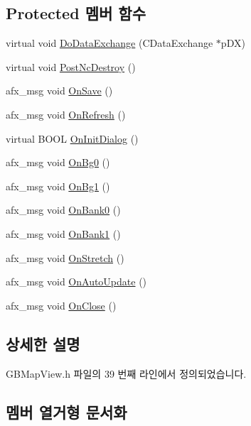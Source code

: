 \subsection*{Protected 멤버 함수}
\begin{DoxyCompactItemize}
\item 
virtual void \mbox{\hyperlink{class_g_b_map_view_a8d268ce36e59f20ebabe08aa9dbed9f0}{Do\+Data\+Exchange}} (C\+Data\+Exchange $\ast$p\+DX)
\item 
virtual void \mbox{\hyperlink{class_g_b_map_view_ac613a0601eb7bea0ca757dda85011b73}{Post\+Nc\+Destroy}} ()
\item 
afx\+\_\+msg void \mbox{\hyperlink{class_g_b_map_view_a667f0f830b816e2ec34519d75a5ad488}{On\+Save}} ()
\item 
afx\+\_\+msg void \mbox{\hyperlink{class_g_b_map_view_ac34b80cd3cb8b8b6d434e59dcfb3bed2}{On\+Refresh}} ()
\item 
virtual B\+O\+OL \mbox{\hyperlink{class_g_b_map_view_a3bcd4b5e76fbe0ae04809770fce64765}{On\+Init\+Dialog}} ()
\item 
afx\+\_\+msg void \mbox{\hyperlink{class_g_b_map_view_a7e9247c42189f718f173f765c4d5a5ba}{On\+Bg0}} ()
\item 
afx\+\_\+msg void \mbox{\hyperlink{class_g_b_map_view_a8cbe9a5f305ebaff40a3a345f444ef98}{On\+Bg1}} ()
\item 
afx\+\_\+msg void \mbox{\hyperlink{class_g_b_map_view_a157cce075c5c7ad137098c04201ce30d}{On\+Bank0}} ()
\item 
afx\+\_\+msg void \mbox{\hyperlink{class_g_b_map_view_a7a1e36efab710bedd617b431486a42b3}{On\+Bank1}} ()
\item 
afx\+\_\+msg void \mbox{\hyperlink{class_g_b_map_view_a9938d288e7e3c1b36757cbf49ff4bb97}{On\+Stretch}} ()
\item 
afx\+\_\+msg void \mbox{\hyperlink{class_g_b_map_view_ad58a2f86c686e80be789229bdee2e64f}{On\+Auto\+Update}} ()
\item 
afx\+\_\+msg void \mbox{\hyperlink{class_g_b_map_view_a71cb2125ab0c6216749d128c16d37bff}{On\+Close}} ()
\end{DoxyCompactItemize}


\subsection{상세한 설명}


G\+B\+Map\+View.\+h 파일의 39 번째 라인에서 정의되었습니다.



\subsection{멤버 열거형 문서화}
\mbox{\label{class_g_b_map_view_a7888981cacff337e7de3a48be4a69e95}} 
